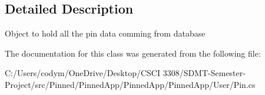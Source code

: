 \subsection{Detailed Description}
Object to hold all the pin data comming from database 



The documentation for this class was generated from the following file\+:\begin{DoxyCompactItemize}
\item 
C\+:/\+Users/codym/\+One\+Drive/\+Desktop/\+C\+S\+C\+I 3308/\+S\+D\+M\+T-\/\+Semester-\/\+Project/src/\+Pinned/\+Pinned\+App/\+Pinned\+App/\+Pinned\+App/\+User/Pin.\+cs\end{DoxyCompactItemize}
